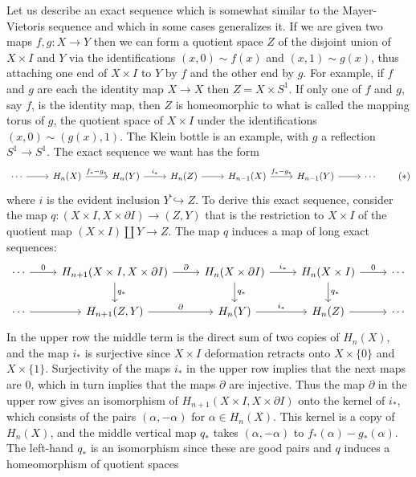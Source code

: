 \begin{example}\label{two cylinder les}
Let us describe an exact sequence which is somewhat similar to the
Mayer-Vietoris sequence and which in some cases generalizes it. If we are given two maps $f,g:X\to Y$ then we can form a quotient space $Z$ of the disjoint union of $X\times I$ and $Y$ via the identifications $(x,0)\sim f(x)$ and $(x,1)\sim g(x)$, thus attaching one end of $X\times I$ to $Y$ by $f$ and the other end by $g$. For example, if $f$ and $g$ are each the
identity map $X\to X$ then $Z=X\times S^1$. If only one of $f$ and $g$, say $f$, is the identity map, then $Z$ is homeomorphic to what is called the mapping torus of $g$, the quotient space of $X\times I$ under the identifications $(x,0)\sim(g(x),1)$. The Klein bottle is an example, with $g$ a reflection $S^1\to S^1$. The exact sequence we want has the form
\begin{equation}
\begin{tikzcd}
\cdots\ar[r]&H_n(X)\ar[r,"f_*-g_*"]&H_n(Y)\ar[r,"i_*"]&H_n(Z)\ar[r]&H_{n-1}(X)\ar[r,"f_*-g_*"]&H_{n-1}(Y)\ar[r]&\cdots
\end{tikzcd}
\tag{$\ast$}
\end{equation}
where $i$ is the evident inclusion $Y֓\hookrightarrow Z$. To derive this exact sequence, consider the map $q:(X\times I,X\times\partial I)\to (Z,Y)$ that is the restriction to $X\times I$ of the quotient map $(X\times I)\amalg Y\to Z$. The map $q$ induces a map of long exact sequences:
\[\begin{tikzcd}
\cdots\ar[r,"0"]&H_{n+1}(X\times I,X\times\partial I)\ar[r,"\partial"]\ar[d,"q_*"]&H_n(X\times\partial I)\ar[r,"i_*"]\ar[d,"q_*"]&H_n(X\times I)\ar[r,"0"]\ar[d,"q_*"]&\cdots\\
\cdots\ar[r]&H_{n+1}(Z,Y)\ar[r,"\partial"]&H_n(Y)\ar[r,"i_*"]&H_n(Z)\ar[r]&\cdots
\end{tikzcd}\]
In the upper row the middle term is the direct sum of two copies of $H_n(X)$, and the map $i_*$ is surjective since $X\times I$ deformation retracts onto $X\times\{0\}$ and $X\times\{1\}$. Surjectivity of the maps $i_*$ in the upper row implies that the next maps are $0$, which in turn implies that the maps $\partial$ are injective. Thus the map $\partial$ in the upper row gives an isomorphism of $H_{n+1}(X\times I,X\times\partial I)$ onto the kernel of $i_*$, which consists of the pairs $(\alpha,-\alpha)$ for $\alpha\in H_n(X)$. This kernel is a copy of $H_n(X)$, and the middle vertical map $q_*$ takes $(\alpha,-\alpha)$ to $f_*(\alpha)-g_*(\alpha)$. The left-hand $q_*$ is an isomorphism since these are good pairs and $q$ induces a homeomorphism of quotient spaces

\end{example}
